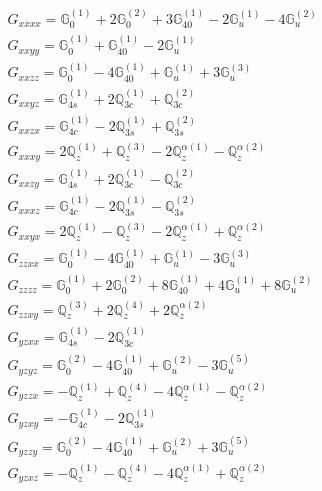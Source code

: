 \documentclass[fleqn,8pt,landscape]{jsarticle}
\begin{document}
\begin{align*}
& G_{xxxx} = \mathbb{G}_{0}^{(1)} + 2 \mathbb{G}_{0}^{(2)} + 3 \mathbb{G}_{40}^{(1)} - 2 \mathbb{G}_{u}^{(1)} - 4 \mathbb{G}_{u}^{(2)} \\
& G_{xxyy} = \mathbb{G}_{0}^{(1)} + \mathbb{G}_{40}^{(1)} - 2 \mathbb{G}_{u}^{(1)} \\
& G_{xxzz} = \mathbb{G}_{0}^{(1)} - 4 \mathbb{G}_{40}^{(1)} + \mathbb{G}_{u}^{(1)} + 3 \mathbb{G}_{u}^{(3)} \\
& G_{xxyz} = \mathbb{G}_{4s}^{(1)} + 2 \mathbb{Q}_{3c}^{(1)} + \mathbb{Q}_{3c}^{(2)} \\
& G_{xxzx} = \mathbb{G}_{4c}^{(1)} - 2 \mathbb{Q}_{3s}^{(1)} + \mathbb{Q}_{3s}^{(2)} \\
& G_{xxxy} = 2 \mathbb{Q}_{z}^{(1)} + \mathbb{Q}_{z}^{(3)} - 2 \mathbb{Q}_{z}^{\alpha(1)} - \mathbb{Q}_{z}^{\alpha(2)} \\
& G_{xxzy} = \mathbb{G}_{4s}^{(1)} + 2 \mathbb{Q}_{3c}^{(1)} - \mathbb{Q}_{3c}^{(2)} \\
& G_{xxxz} = \mathbb{G}_{4c}^{(1)} - 2 \mathbb{Q}_{3s}^{(1)} - \mathbb{Q}_{3s}^{(2)} \\
& G_{xxyx} = 2 \mathbb{Q}_{z}^{(1)} - \mathbb{Q}_{z}^{(3)} - 2 \mathbb{Q}_{z}^{\alpha(1)} + \mathbb{Q}_{z}^{\alpha(2)} \\
& G_{zzxx} = \mathbb{G}_{0}^{(1)} - 4 \mathbb{G}_{40}^{(1)} + \mathbb{G}_{u}^{(1)} - 3 \mathbb{G}_{u}^{(3)} \\
& G_{zzzz} = \mathbb{G}_{0}^{(1)} + 2 \mathbb{G}_{0}^{(2)} + 8 \mathbb{G}_{40}^{(1)} + 4 \mathbb{G}_{u}^{(1)} + 8 \mathbb{G}_{u}^{(2)} \\
& G_{zzxy} = \mathbb{Q}_{z}^{(3)} + 2 \mathbb{Q}_{z}^{(4)} + 2 \mathbb{Q}_{z}^{\alpha(2)} \\
& G_{yzxx} = \mathbb{G}_{4s}^{(1)} - 2 \mathbb{Q}_{3c}^{(1)} \\
& G_{yzyz} = \mathbb{G}_{0}^{(2)} - 4 \mathbb{G}_{40}^{(1)} + \mathbb{G}_{u}^{(2)} - 3 \mathbb{G}_{u}^{(5)} \\
& G_{yzzx} = - \mathbb{Q}_{z}^{(1)} + \mathbb{Q}_{z}^{(4)} - 4 \mathbb{Q}_{z}^{\alpha(1)} - \mathbb{Q}_{z}^{\alpha(2)} \\
& G_{yzxy} = - \mathbb{G}_{4c}^{(1)} - 2 \mathbb{Q}_{3s}^{(1)} \\
& G_{yzzy} = \mathbb{G}_{0}^{(2)} - 4 \mathbb{G}_{40}^{(1)} + \mathbb{G}_{u}^{(2)} + 3 \mathbb{G}_{u}^{(5)} \\
& G_{yzxz} = - \mathbb{Q}_{z}^{(1)} - \mathbb{Q}_{z}^{(4)} - 4 \mathbb{Q}_{z}^{\alpha(1)} + \mathbb{Q}_{z}^{\alpha(2)}
\end{align*}
\end{document}
